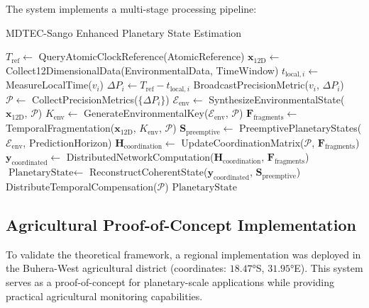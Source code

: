 \documentclass[12pt,a4paper]{article}
\begin{document}
The system implements a multi-stage processing pipeline:

\begin{algorithm}
\caption{MDTEC-Sango Enhanced Planetary State Estimation}
\begin{algorithmic}
    \State $T_{\text{ref}} \leftarrow$ QueryAtomicClockReference(AtomicReference)
    \State $\mathbf{x}_{\text{12D}} \leftarrow$ Collect12DimensionalData(EnvironmentalData, TimeWindow)
        \State $t_{\text{local},i} \leftarrow$ MeasureLocalTime($v_i$)
        \State $\Delta P_i \leftarrow T_{\text{ref}} - t_{\text{local},i}$
        \State BroadcastPrecisionMetric($v_i$, $\Delta P_i$)
    \EndFor
    \State $\mathcal{P} \leftarrow$ CollectPrecisionMetrics($\{\Delta P_i\}$)
    \State $\mathcal{E}_{\text{env}} \leftarrow$ SynthesizeEnvironmentalState($\mathbf{x}_{\text{12D}}$, $\mathcal{P}$)
    \State $K_{\text{env}} \leftarrow$ GenerateEnvironmentalKey($\mathcal{E}_{\text{env}}$, $\mathcal{P}$)
    \State $\mathbf{F}_{\text{fragments}} \leftarrow$ TemporalFragmentation($\mathbf{x}_{\text{12D}}$, $K_{\text{env}}$, $\mathcal{P}$)
    \State $\mathbf{S}_{\text{preemptive}} \leftarrow$ PreemptivePlanetaryStates($\mathcal{E}_{\text{env}}$, PredictionHorizon)
    \State $\mathbf{H}_{\text{coordination}} \leftarrow$ UpdateCoordinationMatrix($\mathcal{P}$, $\mathbf{F}_{\text{fragments}}$)
    \State $\mathbf{y}_{\text{coordinated}} \leftarrow$ DistributedNetworkComputation($\mathbf{H}_{\text{coordination}}$, $\mathbf{F}_{\text{fragments}}$)
    \State $\text{PlanetaryState} \leftarrow$ ReconstructCoherentState($\mathbf{y}_{\text{coordinated}}$, $\mathbf{S}_{\text{preemptive}}$)
    \State DistributeTemporalCompensation($\mathcal{P}$)
    \State \Return $\text{PlanetaryState}$
\EndProcedure
\end{algorithmic}
\end{algorithm}

\subsection{Agricultural Proof-of-Concept Implementation}

To validate the theoretical framework, a regional implementation was deployed in the Buhera-West agricultural district (coordinates: $18.47°$S, $31.95°$E). This system serves as a proof-of-concept for planetary-scale applications while providing practical agricultural monitoring capabilities.
\end{document}
